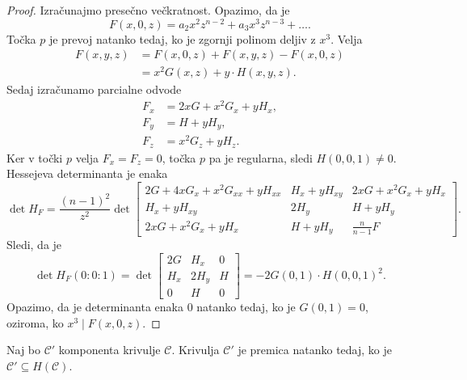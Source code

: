 \begin{proof}
Izračunajmo presečno večkratnost. Opazimo, da je
\[
F(x,0,z) = a_2 x^2 z^{n-2} + a_3 x^3 z^{n-3} + \dots.
\]
Točka $p$ je prevoj natanko tedaj, ko je zgornji polinom deljiv z
$x^3$. Velja
\begin{align*}
F(x,y,z) &= F(x,0,z) + F(x,y,z) - F(x,0,z)
\\
&=
x^2 G(x,z) + y \cdot H(x,y,z).
\end{align*}
Sedaj izračunamo parcialne odvode
\begin{align*}
F_x &= 2x G + x^2 G_x + y H_x,
\\
F_y &= H + y H_y,
\\
F_z &= x^2 G_z + y H_z.
\end{align*}
Ker v točki $p$ velja $F_x = F_z = 0$, točka $p$ pa je regularna,
sledi $H(0,0,1) \ne 0$. Hessejeva determinanta je enaka
\[
\det H_F = \frac{(n-1)^2}{z^2} \det \begin{bmatrix}
2G + 4x G_x + x^2 G_{xx} + y H_{xx} &
H_x + y H_{xy} &
2x G + x^2 G_x + y H_x
\\
H_x + y H_{xy} &
2H_y &
H + y H_y
\\
2x G + x^2 G_x + y H_x &
H + y H_y &
\frac{n}{n-1} F
\end{bmatrix}.
\]
Sledi, da je
\[
\det H_F (0 : 0 : 1) =
\det \begin{bmatrix}
2G  & H_x   & 0 \\
H_x & 2 H_y & H \\
0   & H     & 0
\end{bmatrix} =
-2 G(0,1) \cdot H(0,0,1)^2.
\]
Opazimo, da je determinanta enaka $0$ natanko tedaj, ko je
$G(0,1) = 0$, oziroma, ko $x^3 \mid F(x, 0, z)$.
\end{proof}

\begin{izrek}\label{iz:1}
Naj bo $\mathcal{C}'$ komponenta krivulje $\mathcal{C}$. Krivulja
$\mathcal{C}'$ je premica natanko tedaj, ko je
$\mathcal{C}' \subseteq H(\mathcal{C})$.
\end{izrek}

